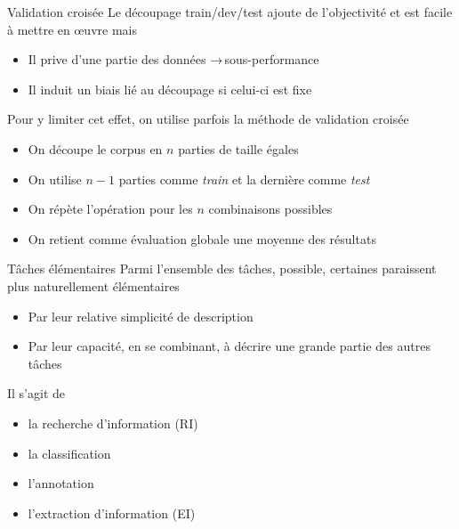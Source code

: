 \documentclass[hyperref={unicode}, xcolor={svgnames}, french]{beamer}
\begin{document}
\begin{frame}[fragile]{Validation croisée}
    Le découpage train/dev/test ajoute de l'objectivité et est facile à mettre en œuvre mais
    \begin{itemize}
        \item Il prive d'une partie des données → sous-performance
        \item Il induit un biais lié au découpage si celui-ci est fixe
    \end{itemize}

    Pour y limiter cet effet, on utilise parfois la méthode de validation croisée
    \begin{itemize}
        \item<1-> On découpe le corpus en $n$ parties de taille égales
        \item<2-> On utilise $n-1$ parties comme \textcolor{highlighta}{\textit{train}} et la dernière comme \textcolor{highlight6}{\textit{test}}
        \item<3-> On répète l'opération pour les $n$ combinaisons possibles
        \item<12-> On retient comme évaluation globale une moyenne des résultats
    \end{itemize}
    \begin{center}
        \tikzset{external/export=true}
    \end{center}
\end{frame}

\begin{frame}{Tâches élémentaires}
    Parmi l'ensemble des tâches, possible, certaines paraissent plus naturellement élémentaires
    \begin{itemize}
        \item Par leur relative simplicité de description
        \item Par leur capacité, en se combinant, à décrire une grande partie des autres tâches
    \end{itemize}

    Il s'agit de
        \begin{itemize}
            \item la recherche d'information (RI)
            \item la classification
            \item l'annotation
            \item l'extraction d'information (EI)
        \end{itemize}
\end{frame}
\end{document}
